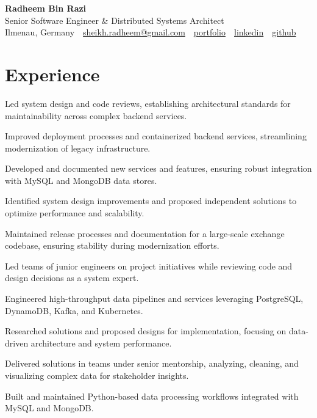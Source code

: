 \documentclass[11pt,a4paper]{resume}
\makeatletter
\newcommand{\Portfolio}{https://radheem.github.io/my-cv}
\newcommand{\PortfolioText}{portfolio}
\newcommand{\GitHub}{https://github.com/radheem}
\newcommand{\LinkedIn}{https://www.linkedin.com/in/radheem-razi}
\newcommand{\Email}{sheikh.radheem@gmail.com}
\makeatother
\begin{document}
\begin{center}
  {\huge\bfseries Radheem Bin Razi}\\[3pt]
  {\large Senior Software Engineer \& Distributed Systems Architect}\\[6pt]
  \small
  Ilmenau, Germany \,\textbar\,
  \href{mailto:\Email}{\Email} \,\textbar\,
  \href{\Portfolio}{\PortfolioText} \,\textbar\,
  \href{\LinkedIn}{linkedin} \,\textbar\,
  \href{\GitHub}{github}
\end{center}
\vspace{2pt}

\section{Experience}

\bullets
  \item Led system design and code reviews, establishing architectural standards for maintainability across complex backend services.
  \item Improved deployment processes and containerized backend services, streamlining modernization of legacy infrastructure.
  \item Developed and documented new services and features, ensuring robust integration with MySQL and MongoDB data stores.
\bulletsend
\vspace{3pt}
\bullets
  \item Identified system design improvements and proposed independent solutions to optimize performance and scalability.
  \item Maintained release processes and documentation for a large-scale exchange codebase, ensuring stability during modernization efforts.
  \item Led teams of junior engineers on project initiatives while reviewing code and design decisions as a system expert.
  \item Engineered high-throughput data pipelines and services leveraging PostgreSQL, DynamoDB, Kafka, and Kubernetes.
\bulletsend
\vspace{3pt}
\bullets
  \item Researched solutions and proposed designs for implementation, focusing on data-driven architecture and system performance.
  \item Delivered solutions in teams under senior mentorship, analyzing, cleaning, and visualizing complex data for stakeholder insights.
  \item Built and maintained Python-based data processing workflows integrated with MySQL and MongoDB.
\bulletsend
\vspace{3pt}
\end{document}
